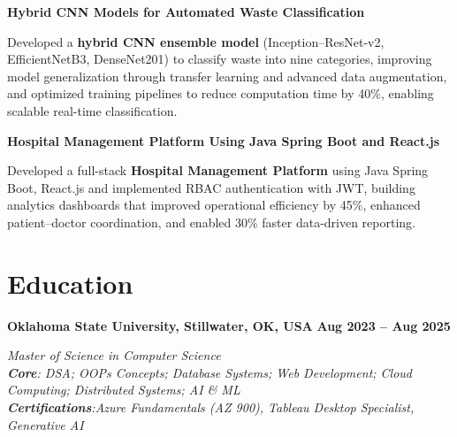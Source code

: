 \documentclass[letterpaper,10pt]{article}
\newcommand{\heading}[2]{
  \hspace{1pt}#1\hfill#2\\
}
\newcommand{\headingBf}[2]{
  \heading{\textbf{#1}}{\textbf{#2}}
}
\newcommand{\headingIt}[2]{
  \heading{\textit{#1}}{\textit{#2}}
}
\newenvironment{resume_list}{
  \vspace{-7pt}
  \begin{itemize}[itemsep=-1.5px, parsep=1pt, leftmargin=10pt]
}{
  \end{itemize}
}
\begin{document}
  \headingBf{Hybrid CNN Models for Automated Waste Classification}{}
  \begin{resume_list}
    \item Developed a \textbf{hybrid CNN ensemble model} (Inception–ResNet-v2, EfficientNetB3, DenseNet201) to classify waste into nine categories, improving model generalization through transfer learning and advanced data augmentation, and optimized training pipelines to reduce computation time by 40\%, enabling scalable real-time classification.
     \end{resume_list}
\headingBf{Hospital Management Platform Using Java Spring Boot and React.js}{}
  \begin{resume_list}
    \item Developed a full-stack \textbf{Hospital Management Platform} using Java Spring Boot, React.js and implemented RBAC authentication with JWT, building analytics dashboards that improved operational efficiency by 45\%, enhanced patient–doctor coordination, and enabled 30\% faster data-driven reporting.
  \end{resume_list}

  \section{Education}
  \headingBf{Oklahoma State University, Stillwater, OK, USA}{ Aug 2023 -- Aug 2025}{} %
  \headingIt{Master of Science in Computer Science}{}
  \headingIt{\textbf{Core}: DSA; OOPs Concepts; Database Systems; Web Development; Cloud Computing; Distributed Systems; AI \& ML}{}
  \headingIt{\textbf{Certifications}:Azure Fundamentals (AZ 900), Tableau Desktop Specialist, Generative AI}{}
 
\end{document}
